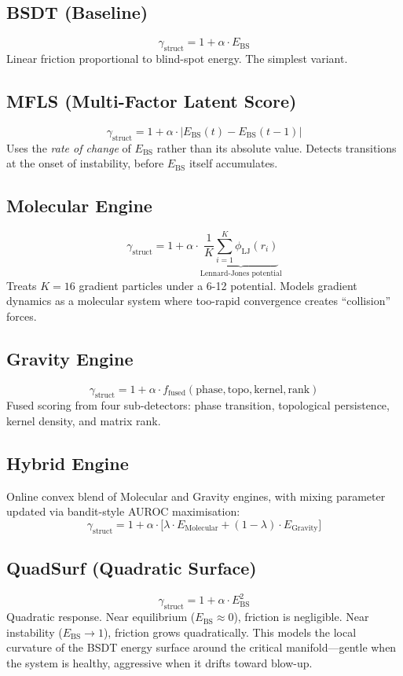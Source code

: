 \documentclass[11pt,a4paper]{article}
\begin{document}
\subsection{BSDT (Baseline)}
\[
  \gamma_{\mathrm{struct}} = 1 + \alpha \cdot E_{\mathrm{BS}}
\]
Linear friction proportional to blind-spot energy.  The simplest variant.

\subsection{MFLS (Multi-Factor Latent Score)}
\[
  \gamma_{\mathrm{struct}} = 1 + \alpha \cdot |E_{\mathrm{BS}}(t) - E_{\mathrm{BS}}(t-1)|
\]
Uses the \emph{rate of change} of $E_{\mathrm{BS}}$ rather than its absolute value.
Detects transitions at the onset of instability, before $E_{\mathrm{BS}}$ itself accumulates.

\subsection{Molecular Engine}
\[
  \gamma_{\mathrm{struct}} = 1 + \alpha \cdot \underbrace{\frac{1}{K}\sum_{i=1}^{K} \phi_{\mathrm{LJ}}(r_i)}_{\text{Lennard-Jones potential}}
\]
Treats $K=16$ gradient particles under a 6-12 potential.  Models gradient dynamics as a molecular system where too-rapid convergence creates ``collision'' forces.

\subsection{Gravity Engine}
\[
  \gamma_{\mathrm{struct}} = 1 + \alpha \cdot f_{\mathrm{fused}}(\text{phase}, \text{topo}, \text{kernel}, \text{rank})
\]
Fused scoring from four sub-detectors: phase transition, topological persistence, kernel density, and matrix rank.

\subsection{Hybrid Engine}
Online convex blend of Molecular and Gravity engines, with mixing parameter updated via bandit-style AUROC maximisation:
\[
  \gamma_{\mathrm{struct}} = 1 + \alpha \cdot \bigl[\lambda \cdot E_{\mathrm{Molecular}} + (1-\lambda) \cdot E_{\mathrm{Gravity}}\bigr]
\]

\subsection{QuadSurf (Quadratic Surface)}
\[
  \gamma_{\mathrm{struct}} = 1 + \alpha \cdot E_{\mathrm{BS}}^2
\]
Quadratic response.  Near equilibrium ($E_{\mathrm{BS}} \approx 0$), friction is negligible.
Near instability ($E_{\mathrm{BS}} \to 1$), friction grows quadratically.  This models the local curvature of the BSDT energy surface around the critical manifold---gentle when the system is healthy, aggressive when it drifts toward blow-up.
\end{document}
